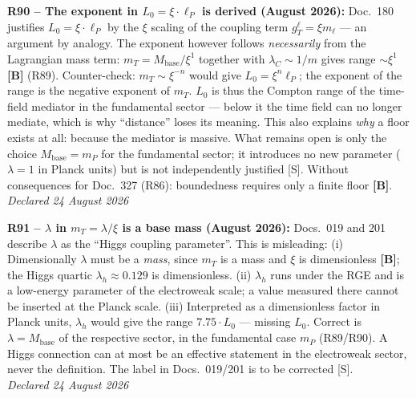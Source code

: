 \medskip
\textbf{R90 -- The exponent in $L_0 = \xi\cdot\ell_P$ is derived (August 2026):}
Doc.~180 justifies $L_0 = \xi\cdot\ell_P$ by the $\xi$ scaling of the coupling term $g_T^\ell = \xi m_\ell$ --- an argument by analogy.
The exponent however follows \emph{necessarily} from the Lagrangian mass term: $m_T = M_\mathrm{base}/\xi^1$ together with $\lambda_C \sim 1/m$ gives range $\sim\xi^1$ \textbf{[B]} (R89).
Counter-check: $m_T \sim \xi^{-n}$ would give $L_0 = \xi^n\ell_P$; the exponent of the range is the negative exponent of $m_T$.
$L_0$ is thus the Compton range of the time-field mediator in the fundamental sector --- below it the time field can no longer mediate, which is why \enquote{distance} loses its meaning. This also explains \emph{why} a floor exists at all: because the mediator is massive.
What remains open is only the choice $M_\mathrm{base} = m_P$ for the fundamental sector; it introduces no new parameter ($\lambda = 1$ in Planck units) but is not independently justified [S].
Without consequences for Doc.~327 (R86): boundedness requires only a finite floor \textbf{[B]}.\\
\emph{Declared 24 August 2026}

\medskip
\textbf{R91 -- $\lambda$ in $m_T = \lambda/\xi$ is a base mass (August 2026):}
Docs.~019 and 201 describe $\lambda$ as the \enquote{Higgs coupling parameter}. This is misleading:
(i) Dimensionally $\lambda$ must be a \emph{mass}, since $m_T$ is a mass and $\xi$ is dimensionless \textbf{[B]}; the Higgs quartic $\lambda_h \approx 0.129$ is dimensionless.
(ii) $\lambda_h$ runs under the RGE and is a low-energy parameter of the electroweak scale; a value measured there cannot be inserted at the Planck scale.
(iii) Interpreted as a dimensionless factor in Planck units, $\lambda_h$ would give the range $7.75\cdot L_0$ --- missing $L_0$.
Correct is $\lambda = M_\mathrm{base}$ of the respective sector, in the fundamental case $m_P$ (R89/R90).
A Higgs connection can at most be an effective statement in the electroweak sector, never the definition. The label in Docs.~019/201 is to be corrected [S].\\
\emph{Declared 24 August 2026}

